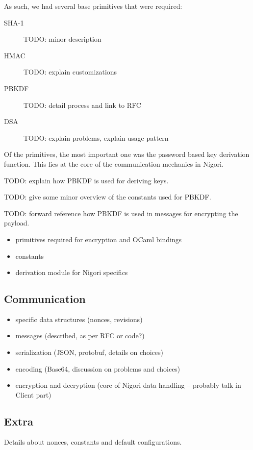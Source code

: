 As such, we had several base primitives that were required:
\begin{description}
  \item[SHA-1] TODO: minor description
  \item[HMAC] TODO: explain customizations
  \item[PBKDF] TODO: detail process and link to RFC
  \item[DSA] TODO: explain problems, explain usage pattern
\end{description}

Of the primitives, the most important one was the password based key derivation function.
This lies at the core of the communication mechanics in Nigori.

TODO: explain how PBKDF is used for deriving keys.

TODO: give some minor overview of the constants used for PBKDF.

TODO: forward reference how PBKDF is used in messages for encrypting the payload.

\begin{itemize}
  \item primitives required for encryption and OCaml bindings
  \item constants
  \item derivation module for Nigori specifics
\end{itemize}

\subsection{Communication}
\begin{itemize}
  \item specific data structures (nonces, revisions)
  \item messages (described, as per RFC or code?)
  \item serialization (JSON, protobuf, details on choices)
  \item encoding (Base64, discussion on problems and choices)
  \item encryption and decryption (core of Nigori data handling -- probably talk in Client part)
\end{itemize}

\subsection{Extra}
Details about nonces, constants and default configurations.

